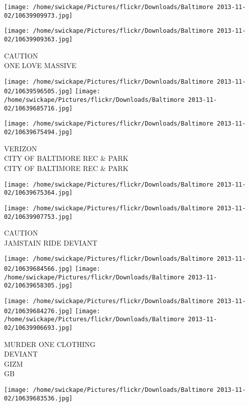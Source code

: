 \documentclass[10pt,letterpaper]{article}
\begin{document}
\texttt{[image: /home/swickape/Pictures/flickr/Downloads/Baltimore 2013-11-02/10639909973.jpg]}

\vspace{0.25in}
\texttt{[image: /home/swickape/Pictures/flickr/Downloads/Baltimore 2013-11-02/10639909363.jpg]}

CAUTION\\
ONE LOVE MASSIVE\\
\pagebreak

\texttt{[image: /home/swickape/Pictures/flickr/Downloads/Baltimore 2013-11-02/10639596505.jpg]}
\texttt{[image: /home/swickape/Pictures/flickr/Downloads/Baltimore 2013-11-02/10639685716.jpg]}

\vspace{0.25in}
\texttt{[image: /home/swickape/Pictures/flickr/Downloads/Baltimore 2013-11-02/10639675494.jpg]}

VERIZON\\
CITY OF BALTIMORE REC \& PARK\\
CITY OF BALTIMORE REC \& PARK\\
\pagebreak

\texttt{[image: /home/swickape/Pictures/flickr/Downloads/Baltimore 2013-11-02/10639675364.jpg]}

\vspace{0.25in}
\texttt{[image: /home/swickape/Pictures/flickr/Downloads/Baltimore 2013-11-02/10639907753.jpg]}

CAUTION\\
JAMSTAIN RIDE DEVIANT\\
\pagebreak

\texttt{[image: /home/swickape/Pictures/flickr/Downloads/Baltimore 2013-11-02/10639684566.jpg]}
\texttt{[image: /home/swickape/Pictures/flickr/Downloads/Baltimore 2013-11-02/10639658305.jpg]}

\texttt{[image: /home/swickape/Pictures/flickr/Downloads/Baltimore 2013-11-02/10639684276.jpg]}
\texttt{[image: /home/swickape/Pictures/flickr/Downloads/Baltimore 2013-11-02/10639906693.jpg]}

MURDER ONE CLOTHING\\
DEVIANT\\
GIZM\\
GB\\
\pagebreak

\texttt{[image: /home/swickape/Pictures/flickr/Downloads/Baltimore 2013-11-02/10639683536.jpg]}
\end{document}
